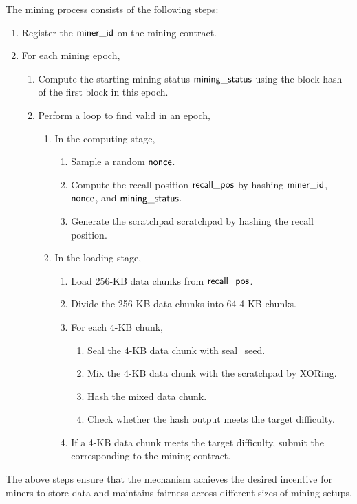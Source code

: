 The mining process consists of the following steps:
\begin{enumerate}
	\item Register the $\sf miner\_id$ on the mining contract.
	\item For each mining epoch,
	\begin{enumerate}
		\item Compute the starting mining status $\sf mining\_status$ using the block hash of the first block in this epoch.
		\item Perform a loop to find valid \sproof in an epoch,
		\begin{enumerate}
			\item In the computing stage,
			\begin{enumerate}
				\item Sample a random $\sf nonce$.
				\item Compute the recall position $\sf recall\_pos$ by hashing $\sf miner\_id$, $\sf nonce$, and $\sf mining\_status$.
				\item Generate the scratchpad {\sf scratchpad} by hashing the recall position.
			\end{enumerate}
			\item In the loading stage,
			\begin{enumerate}
				\item Load 256-KB data chunks from $\sf recall\_pos$.
				\item Divide the 256-KB data chunks into 64 4-KB chunks.
				\item For each 4-KB chunk,
				\begin{enumerate}
					\item Seal the 4-KB data chunk with {\sf seal\_seed}.
					\item Mix the 4-KB data chunk with the scratchpad by XORing.
					\item Hash the mixed data chunk.
					\item Check whether the hash output meets the target difficulty.
				\end{enumerate}
				\item If a 4-KB data chunk meets the target difficulty, submit the corresponding \sproof to the mining contract.
			\end{enumerate}
		\end{enumerate}
	\end{enumerate}
\end{enumerate}

The above steps ensure that the \sproof mechanism achieves the desired incentive for miners to store data and maintains fairness across different sizes of mining setups.
